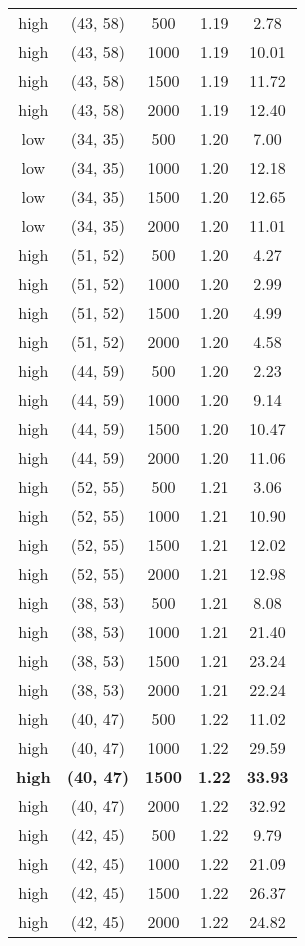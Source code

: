 \begin{tabular}{c c c c c}
high & (43, 58) &  500 & 1.19 & 2.78 \\
high & (43, 58) &  1000 & 1.19 & 10.01 \\
high & (43, 58) &  1500 & 1.19 & 11.72 \\
high & (43, 58) &  2000 & 1.19 & 12.40 \\
low & (34, 35) &  500 & 1.20 & 7.00 \\
low & (34, 35) &  1000 & 1.20 & 12.18 \\
low & (34, 35) &  1500 & 1.20 & 12.65 \\
low & (34, 35) &  2000 & 1.20 & 11.01 \\
high & (51, 52) &  500 & 1.20 & 4.27 \\
high & (51, 52) &  1000 & 1.20 & 2.99 \\
high & (51, 52) &  1500 & 1.20 & 4.99 \\
high & (51, 52) &  2000 & 1.20 & 4.58 \\
high & (44, 59) &  500 & 1.20 & 2.23 \\
high & (44, 59) &  1000 & 1.20 & 9.14 \\
high & (44, 59) &  1500 & 1.20 & 10.47 \\
high & (44, 59) &  2000 & 1.20 & 11.06 \\
high & (52, 55) &  500 & 1.21 & 3.06 \\
high & (52, 55) &  1000 & 1.21 & 10.90 \\
high & (52, 55) &  1500 & 1.21 & 12.02 \\
high & (52, 55) &  2000 & 1.21 & 12.98 \\
high & (38, 53) &  500 & 1.21 & 8.08 \\
high & (38, 53) &  1000 & 1.21 & 21.40 \\
high & (38, 53) &  1500 & 1.21 & 23.24 \\
high & (38, 53) &  2000 & 1.21 & 22.24 \\
high & (40, 47) &  500 & 1.22 & 11.02 \\
high & (40, 47) &  1000 & 1.22 & 29.59 \\
\textbf{high} & \textbf{(40, 47)} & \textbf{ 1500} & \textbf{1.22} & \textbf{33.93} \\
high & (40, 47) &  2000 & 1.22 & 32.92 \\
high & (42, 45) &  500 & 1.22 & 9.79 \\
high & (42, 45) &  1000 & 1.22 & 21.09 \\
high & (42, 45) &  1500 & 1.22 & 26.37 \\
high & (42, 45) &  2000 & 1.22 & 24.82 \\

\end{tabular}
